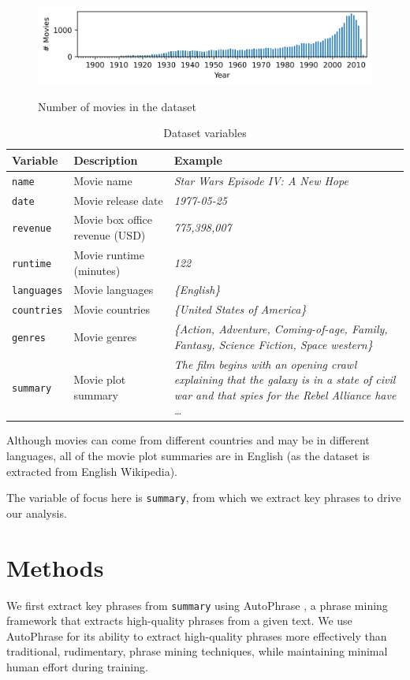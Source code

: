 \documentclass{article}
\begin{document}
\begin{multicols}{2}
\begin{figure}
\caption{Number of movies in the dataset}
\centering
\includegraphics[width=5in]{figures/number_movies_per_year_bar_chart.png}
\label{figure:number_movies_per_year_bar_chart}
\end{figure}

\begin{table}
\caption{Dataset variables}
\centering
\begin{tabularx}{.8\textwidth}{llX}
    \textbf{Variable} & \textbf{Description} & \textbf{Example} \\
    \hline
    \texttt{name} & Movie name & \textit{Star Wars Episode IV: A New Hope} \\
    \texttt{date} & Movie release date & \textit{1977-05-25} \\
    \texttt{revenue} & Movie box office revenue (USD) & \textit{775,398,007} \\
    \texttt{runtime} & Movie runtime (minutes) & \textit{122} \\
    \texttt{languages} & Movie languages & \textit{\{English\}} \\
    \texttt{countries} & Movie countries & \textit{\{United States of America\}} \\
    \texttt{genres} & Movie genres & \textit{\{Action, Adventure, Coming-of-age, Family, Fantasy, Science Fiction, Space western\}} \\
    \texttt{summary} & Movie plot summary & \textit{The film begins with an opening crawl explaining that the galaxy is in a state of civil war and that spies for the Rebel Alliance have \ldots} \\
\end{tabularx}
\label{table:variables}
\end{table}

Although movies can come from different countries and may be in different languages, all of the movie plot summaries are in English (as the dataset is extracted from English Wikipedia).

The variable of focus here is \texttt{summary}, from which we extract key phrases to drive our analysis.

\section{Methods} %
We first extract key phrases from \texttt{summary} using AutoPhrase \cite{Shang2018AutomatedPM}, a phrase mining framework that extracts high-quality phrases from a given text. We use AutoPhrase for its ability to extract high-quality phrases more effectively than traditional, rudimentary, phrase mining techniques, while maintaining minimal human effort during training.


\end{multicols}
\end{document}

